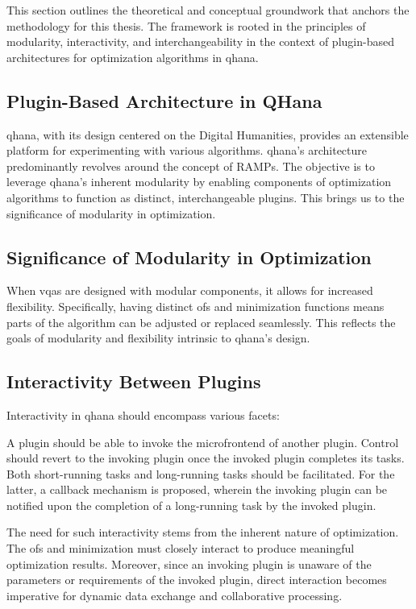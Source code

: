 \documentclass[
  a4paper,  %
  twoside,  %
  bibliography=totoc,
  headsepline,
  cleardoublepage=empty,
  parskip=half,
  draft=false
]{scrbook}
\begin{document}
This section outlines the theoretical and conceptual groundwork that anchors the methodology for this thesis.
The framework is rooted in the principles of modularity, interactivity, and interchangeability in the context of plugin-based architectures for optimization algorithms in \gls{qhana}.

\subsection{Plugin-Based Architecture in QHana}
\gls{qhana}, with its design centered on the Digital Humanities, provides an extensible platform for experimenting with various algorithms.
\gls{qhana}'s architecture predominantly revolves around the concept of RAMPs.
The objective is to leverage \gls{qhana}'s inherent modularity by enabling components of optimization algorithms to function as distinct, interchangeable plugins.
This brings us to the significance of modularity in optimization.

\subsection{Significance of Modularity in Optimization}
When \glspl{vqa} are designed with modular components, it allows for increased flexibility.
Specifically, having distinct \glspl{of} and minimization functions means parts of the algorithm can be adjusted or replaced seamlessly.
This reflects the goals of modularity and flexibility intrinsic to \gls{qhana}'s design.

\subsection{Interactivity Between Plugins}
Interactivity in \gls{qhana} should encompass various facets:

A plugin should be able to invoke the microfrontend of another plugin.
Control should revert to the invoking plugin once the invoked plugin completes its tasks.
Both short-running tasks and long-running tasks should be facilitated.
For the latter, a callback mechanism is proposed, wherein the invoking plugin can be notified upon the completion of a long-running task by the invoked plugin.

The need for such interactivity stems from the inherent nature of optimization.
The \glspl{of} and minimization must closely interact to produce meaningful optimization results.
Moreover, since an invoking plugin is unaware of the parameters or requirements of the invoked plugin, direct interaction becomes imperative for dynamic data exchange and collaborative processing.
\end{document}
